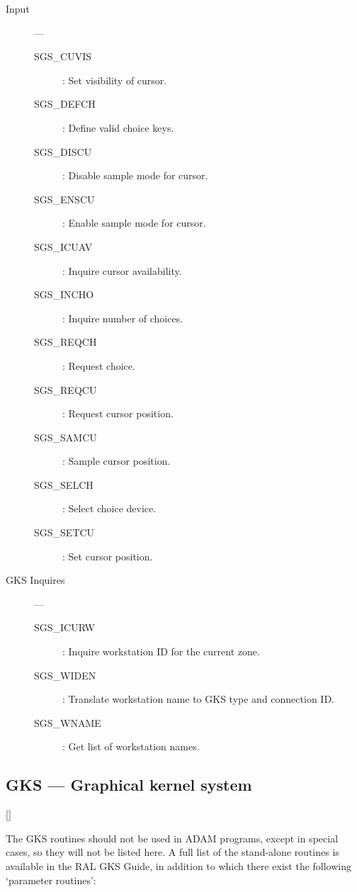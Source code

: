 \begin{description}
\item [Input] ---

\begin{description}
\item [SGS\_CUVIS] : Set visibility of cursor.
\item [SGS\_DEFCH] : Define valid choice keys.
\item [SGS\_DISCU] : Disable sample mode for cursor.
\item [SGS\_ENSCU] : Enable sample mode for cursor.
\item [SGS\_ICUAV] : Inquire cursor availability.
\item [SGS\_INCHO] : Inquire number of choices.
\item [SGS\_REQCH] : Request choice.
\item [SGS\_REQCU] : Request cursor position.
\item [SGS\_SAMCU] : Sample cursor position.
\item [SGS\_SELCH] : Select choice device.
\item [SGS\_SETCU] : Set cursor position.
\end{description}

\item [GKS Inquires] ---

\begin{description}
\item [SGS\_ICURW] : Inquire workstation ID for the current zone.
\item [SGS\_WIDEN] : Translate workstation name to GKS type and connection ID.
\item [SGS\_WNAME] : Get list of workstation names.
\end{description}

\end{description}

\newpage

\subsection{GKS --- Graphical kernel system}

\vspace{-9mm}

\hfill []

\vspace{2mm}

The GKS routines should not be used in ADAM programs, except in special cases,
so they will not be listed here.
A full list of the stand-alone routines is available in the RAL GKS Guide, in
addition to which there exist the following `parameter routines':

